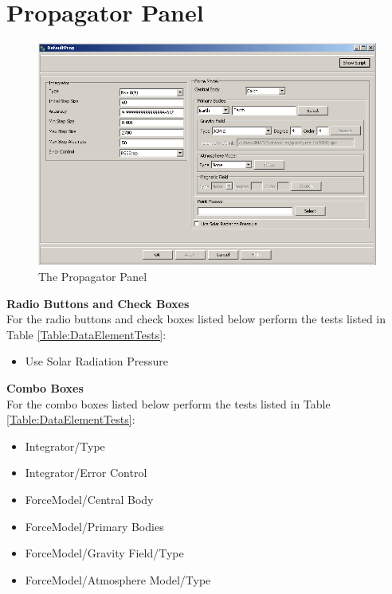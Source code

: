 \section{Propagator Panel}


\begin{figure}[ht]
\begin{center}
\includegraphics[468,337]{Images/Propagator.png}
\caption{\label{figure:Propagator} The Propagator Panel}
\end{center}
\end{figure}



\textbf{Radio Buttons and Check Boxes}\\

\noindent For the radio buttons and check boxes listed below perform
the tests listed in Table \ref{Table:DataElementTests}:
%
\begin{itemize}
    \item Use Solar Radiation Pressure
\end{itemize}


\noindent\textbf{Combo Boxes}\\

\noindent For the combo boxes listed below perform the tests listed
in Table \ref{Table:DataElementTests}:
%
\begin{itemize}
    \item Integrator/Type
    \item Integrator/Error Control
    \item ForceModel/Central Body
    \item ForceModel/Primary Bodies
    \item ForceModel/Gravity Field/Type
    \item ForceModel/Atmosphere Model/Type
\end{itemize}


